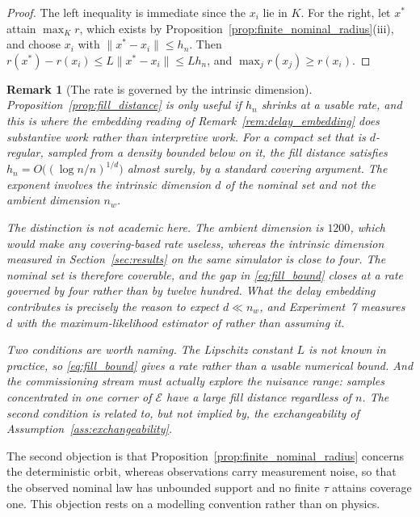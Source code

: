 \documentclass[a4paper]{cas-sc}
\newtheorem{remark}{Remark}
\newcommand{\EtaSpace}{\ensuremath{\mathcal{E}}}
\newcommand{\residual}{\ensuremath{r}}
\begin{document}
\begin{proof}
The left inequality is immediate since the \(x_i\) lie in \(K\). For the
right, let \(x^{*}\) attain \(\max_K\residual\), which exists by
Proposition~\ref{prop:finite_nominal_radius}(iii), and choose \(x_i\) with
\(\lVert x^{*}-x_i\rVert\le h_n\). Then
\(\residual(x^{*})-\residual(x_i)\le L\lVert x^{*}-x_i\rVert\le L h_n\), and
\(\max_j\residual(x_j)\ge\residual(x_i)\).
\end{proof}

\begin{remark}[The rate is governed by the intrinsic dimension]
\label{rem:fill_rate}
Proposition~\ref{prop:fill_distance} is only useful if \(h_n\) shrinks at a
usable rate, and this is where the embedding reading of
Remark~\ref{rem:delay_embedding} does substantive work rather than
interpretive work. For a compact set that is \(d\)-regular, sampled from a
density bounded below on it, the fill distance satisfies
\(h_n = O\bigl((\log n/n)^{1/d}\bigr)\) almost surely, by a standard covering
argument. The exponent involves the \emph{intrinsic} dimension \(d\) of the
nominal set and not the ambient dimension \(n_w\).

The distinction is not academic here. The ambient dimension is \(1200\),
which would make any covering-based rate useless, whereas the intrinsic
dimension measured in Section~\ref{sec:results} on the same simulator is close
to four. The nominal set is therefore coverable, and the gap in
\eqref{eq:fill_bound} closes at a rate governed by four rather than by twelve
hundred. What the delay embedding contributes is precisely the reason to
expect \(d\ll n_w\), and Experiment~7 measures \(d\) with the
maximum-likelihood estimator of \citet{levina2004} rather than assuming it.

Two conditions are worth naming. The Lipschitz constant \(L\) is not known in
practice, so \eqref{eq:fill_bound} gives a rate rather than a usable numerical
bound. And the commissioning stream must actually explore the nuisance range:
samples concentrated in one corner of \(\EtaSpace\) have a large fill distance
regardless of \(n\). The second condition is related to, but not implied by,
the exchangeability of Assumption~\ref{ass:exchangeability}.
\end{remark}

The second objection is that
Proposition~\ref{prop:finite_nominal_radius} concerns the deterministic orbit,
whereas observations carry measurement noise, so that the observed nominal law
has unbounded support and no finite \(\tau\) attains coverage one. This
objection rests on a modelling convention rather than on physics.
\end{document}
